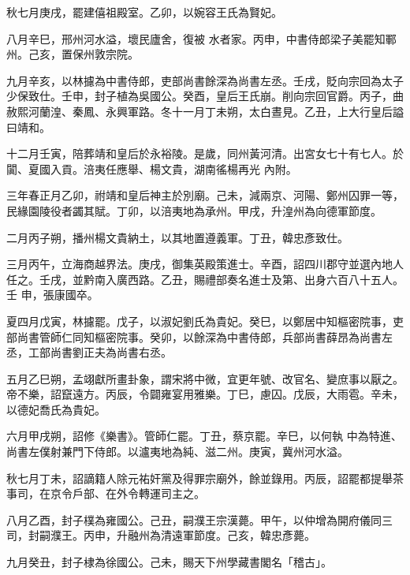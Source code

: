 \begin{pinyinscope}
 秋七月庚戌，罷建僖祖殿室。乙卯，以婉容王氏為賢妃。



 八月辛巳，邢州河水溢，壞民廬舍，復被
 水者家。丙申，中書侍郎梁子美罷知鄆州。己亥，置保州敦宗院。



 九月辛亥，以林攄為中書侍郎，吏部尚書餘深為尚書左丞。壬戌，貶向宗回為太子少保致仕。壬申，封子植為吳國公。癸酉，皇后王氏崩。削向宗回官爵。丙子，曲赦熙河蘭湟、秦鳳、永興軍路。冬十一月丁未朔，太白晝見。乙丑，上大行皇后謚曰靖和。



 十二月壬寅，陪葬靖和皇后於永裕陵。是歲，同州黃河清。出宮女七十有七人。於闐、夏國入貢。涪夷任應舉、楊文貴，湖南徭楊再光
 內附。



 三年春正月乙卯，祔靖和皇后神主於別廟。己未，減兩京、河陽、鄭州囚罪一等，民緣園陵役者蠲其賦。丁卯，以涪夷地為承州。甲戌，升湟州為向德軍節度。



 二月丙子朔，播州楊文貴納土，以其地置遵義軍。丁丑，韓忠彥致仕。



 三月丙午，立海商越界法。庚戌，御集英殿策進士。辛酉，詔四川郡守並選內地人任之。壬戌，並黔南入廣西路。乙丑，賜禮部奏名進士及第、出身六百八十五人。壬
 申，張康國卒。



 夏四月戊寅，林攄罷。戊子，以淑妃劉氏為貴妃。癸巳，以鄭居中知樞密院事，吏部尚書管師仁同知樞密院事。癸卯，以餘深為中書侍郎，兵部尚書薛昂為尚書左丞，工部尚書劉正夫為尚書右丞。



 五月乙巳朔，孟翊獻所畫卦象，謂宋將中微，宜更年號、改官名、變庶事以厭之。帝不樂，詔竄遠方。丙辰，令闢雍宴用雅樂。丁巳，慮囚。戊辰，大雨雹。辛未，以德妃喬氏為貴妃。



 六月甲戌朔，詔修《樂書》。管師仁罷。丁丑，蔡京罷。辛巳，以何執
 中為特進、尚書左僕射兼門下侍郎。以瀘夷地為純、滋二州。庚寅，冀州河水溢。



 秋七月丁未，詔謫籍人除元祐奸黨及得罪宗廟外，餘並錄用。丙辰，詔罷都提舉茶事司，在京令戶部、在外令轉運司主之。



 八月乙酉，封子樸為雍國公。己丑，嗣濮王宗漢薨。甲午，以仲增為開府儀同三司，封嗣濮王。丙申，升融州為清遠軍節度。己亥，韓忠彥薨。



 九月癸丑，封子棣為徐國公。己未，賜天下州學藏書閣名「稽古」。




\end{pinyinscope}
